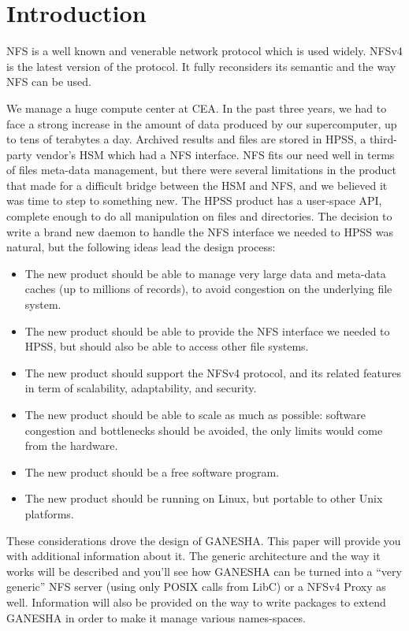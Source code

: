 \documentclass[final]{ols}
\begin{document}
\section{Introduction}
NFS is a well known and venerable network protocol which is used
widely. NFSv4 is the latest version of the protocol. It fully
reconsiders its semantic and the way NFS can be used.

We manage a huge compute center at CEA. In the past three years, we
had to face a strong increase in the amount of data produced by our
supercomputer, up to tens of terabytes a day.  Archived results and
files are stored in HPSS, a third-party vendor's HSM which had a NFS
interface. NFS fits our need well in terms of files meta-data
management, but there were several limitations in the product that
made for a difficult bridge between the HSM and NFS, and we believed it was time to
step to something new. The HPSS product has a user-space API, complete
enough to do all manipulation on files and directories. The decision
to write a brand new daemon to handle the NFS interface we needed to
HPSS was natural, but the following ideas lead the design process:

\begin{itemize}
\item The new product should be able to manage very large data and
  meta-data caches (up to millions of records), to avoid congestion on
  the underlying file system.
\item The new product should be able to provide the NFS interface we
  needed to HPSS, but should also be able to access other file systems.
\item The new product should support the NFSv4 protocol, and its
  related features in term of scalability, adaptability, and security.
\item The new product should be able to scale as much as possible:
  software congestion and bottlenecks should be avoided, the only
  limits would come from the hardware.
\item The new product should be a free software program.
\item The new product should be running on Linux, but portable to
  other Unix platforms.
\end{itemize}

These considerations drove the design of GANESHA. This paper will
provide you with additional information about it.  The generic
architecture and the way it works will be described and you'll see how
GANESHA can be turned into a ``very generic'' NFS server (using only
POSIX calls from LibC) or a NFSv4 Proxy as well.  Information will
also be provided on the way to write packages to extend GANESHA in
order to make it manage various names-spaces.
\end{document}
